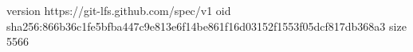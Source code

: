 version https://git-lfs.github.com/spec/v1
oid sha256:866b36c1fe5bfba447c9e813e6f14be861f16d03152f1553f05dcf817db368a3
size 5566
